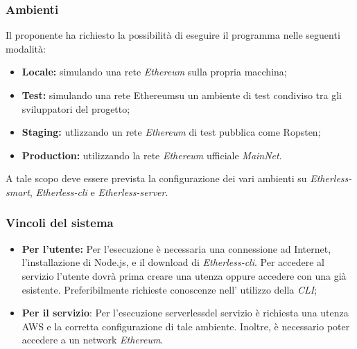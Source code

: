 \subsubsection{Ambienti}
Il proponente ha richiesto la possibilità di eseguire il programma nelle seguenti modalità:
\begin{itemize}
	\item \textbf{Locale:} simulando una rete \textit{Ethereum\glo} sulla propria macchina;
	\item \textbf{Test:} simulando una rete Ethereum\glo su un ambiente di test condiviso tra gli sviluppatori del progetto;
	\item \textbf{Staging:} utlizzando un rete \textit{Ethereum\glo} di test pubblica come Ropsten\glos;
	\item \textbf{Production:} utilizzando la rete \textit{Ethereum\glo} ufficiale \textit{MainNet\glos}.
\end{itemize}
A tale scopo deve essere prevista la configurazione dei vari ambienti su \textit{Etherless-smart}, \textit{Etherless-cli} e \textit{Etherless-server}.

\subsubsection{Vincoli del sistema}
\begin{itemize}
	\item \textbf{Per l'utente:} Per l'esecuzione è necessaria una connessione ad Internet, l'installazione di Node.js, e il download di \textit{Etherless-cli}. Per accedere al servizio l'utente dovrà prima creare una utenza oppure accedere con una già esistente. Preferibilmente richieste conoscenze nell' utilizzo della \textit{CLI\glos};
	\item \textbf{Per il servizio}: Per l'esecuzione serverless\glo del servizio è richiesta una utenza AWS e la corretta configurazione di tale ambiente. Inoltre, è necessario poter accedere a un network \textit{Ethereum\glos}.
\end{itemize}

	